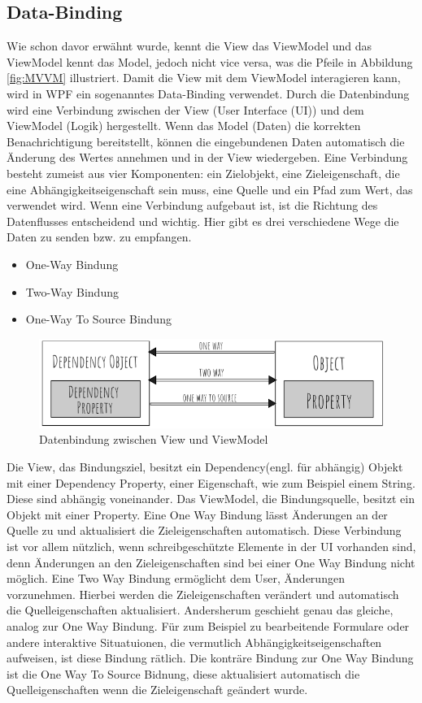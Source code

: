\subsection*{Data-Binding}
Wie schon davor erw\"ahnt wurde, kennt die View das ViewModel und das ViewModel kennt das Model, jedoch nicht vice versa, was die Pfeile in Abbildung \ref{fig:MVVM} illustriert.
Damit die View mit dem ViewModel interagieren kann, wird in WPF ein sogenanntes Data-Binding verwendet.
Durch die Datenbindung wird eine Verbindung zwischen der View (User Interface (UI)) und dem ViewModel (Logik) hergestellt. Wenn das Model (Daten) die korrekten Benachrichtigung bereitstellt, k\"onnen die eingebundenen Daten automatisch die \"Anderung des Wertes annehmen und in der View wiedergeben\cite{Cai2017}.
Eine Verbindung besteht zumeist aus vier Komponenten: ein Zielobjekt, eine Zieleigenschaft, die eine Abh\"angigkeitseigenschaft sein muss, eine Quelle und ein Pfad zum Wert, das verwendet wird. 
Wenn eine Verbindung aufgebaut ist, ist die Richtung des Datenflusses entscheidend und wichtig. Hier gibt es drei verschiedene Wege die Daten zu senden bzw. zu empfangen.
\begin{itemize}
\item One-Way Bindung
\item Two-Way Bindung
\item One-Way To Source Bindung
\end{itemize}
\begin{figure}[h] 
\centering
\includegraphics[scale=0.55]{fig/Data-Binding.png} 
\caption{Datenbindung zwischen View und ViewModel}
\label{fig:DataBinding}
\end{figure} 
Die View, das Bindungsziel, besitzt ein Dependency(engl. f\"ur abh\"angig) Objekt mit einer Dependency Property, einer Eigenschaft, wie zum Beispiel einem String. Diese sind abh\"angig voneinander. Das ViewModel, die Bindungsquelle, besitzt ein Objekt mit einer Property. Eine One Way Bindung l\"asst \"Anderungen an der Quelle zu und aktualisiert die Zieleigenschaften automatisch. Diese Verbindung ist vor allem n\"utzlich, wenn schreibgesch\"utzte Elemente in der UI vorhanden sind, denn \"Anderungen an den Zieleigenschaften sind bei einer One Way Bindung nicht m\"oglich.
Eine Two Way Bindung erm\"oglicht dem User, \"Anderungen vorzunehmen. Hierbei werden die Zieleigenschaften ver\"andert und automatisch die Quelleigenschaften aktualisiert. Andersherum geschieht genau das gleiche, analog zur One Way Bindung. F\"ur zum Beispiel zu bearbeitende Formulare oder andere interaktive Situatuionen, die vermutlich Abh\"angigkeitseigenschaften aufweisen, ist diese Bindung r\"atlich.
Die kontr\"are Bindung zur One Way Bindung ist die One Way To Source Bidnung, diese aktualisiert automatisch die Quelleigenschaften wenn die Zieleigenschaft ge\"andert wurde.
